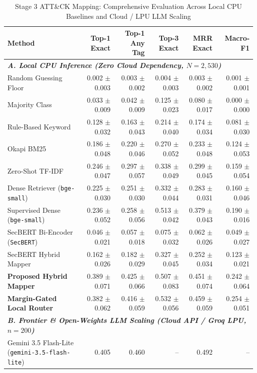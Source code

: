 \begin{table}[t]
\centering
\caption{Stage 3 ATT\&CK Mapping: Comprehensive Evaluation Across Local CPU Baselines and Cloud / LPU LLM Scaling}
\label{tab:baselines}
\begin{tabular}{lrrrrr}
\toprule
Method & Top-1 Exact & Top-1 Any Tag & Top-3 Exact & MRR Exact & Macro-F1 \\ \midrule
\multicolumn{6}{l}{\textit{\textbf{A. Local CPU Inference (Zero Cloud Dependency, $N=2{,}530$)}}} \\ \midrule
Random Guessing Floor & 0.002 $\pm$ 0.003 & 0.003 $\pm$ 0.002 & 0.004 $\pm$ 0.003 & 0.003 $\pm$ 0.002 & 0.001 $\pm$ 0.001 \\
Majority Class & 0.033 $\pm$ 0.009 & 0.042 $\pm$ 0.009 & 0.125 $\pm$ 0.023 & 0.080 $\pm$ 0.017 & 0.000 $\pm$ 0.000 \\
Rule-Based Keyword & 0.128 $\pm$ 0.032 & 0.163 $\pm$ 0.043 & 0.214 $\pm$ 0.040 & 0.174 $\pm$ 0.034 & 0.081 $\pm$ 0.030 \\
Okapi BM25 & 0.186 $\pm$ 0.048 & 0.220 $\pm$ 0.046 & 0.270 $\pm$ 0.052 & 0.233 $\pm$ 0.048 & 0.124 $\pm$ 0.053 \\
Zero-Shot TF-IDF & 0.246 $\pm$ 0.047 & 0.297 $\pm$ 0.057 & 0.338 $\pm$ 0.049 & 0.299 $\pm$ 0.045 & 0.159 $\pm$ 0.054 \\
Dense Retriever (\texttt{bge-small}) & 0.225 $\pm$ 0.030 & 0.251 $\pm$ 0.030 & 0.332 $\pm$ 0.044 & 0.283 $\pm$ 0.031 & 0.160 $\pm$ 0.046 \\
Supervised Dense (\texttt{bge-small}) & 0.236 $\pm$ 0.052 & 0.258 $\pm$ 0.056 & 0.513 $\pm$ 0.042 & 0.379 $\pm$ 0.043 & 0.190 $\pm$ 0.016 \\
SecBERT Bi-Encoder (\texttt{SecBERT}) & 0.046 $\pm$ 0.021 & 0.057 $\pm$ 0.018 & 0.075 $\pm$ 0.032 & 0.062 $\pm$ 0.026 & 0.049 $\pm$ 0.027 \\
SecBERT Hybrid Mapper & 0.162 $\pm$ 0.026 & 0.182 $\pm$ 0.029 & 0.327 $\pm$ 0.045 & 0.252 $\pm$ 0.034 & 0.123 $\pm$ 0.021 \\
\textbf{Proposed Hybrid Mapper} & 0.389 $\pm$ 0.071 & 0.425 $\pm$ 0.066 & 0.507 $\pm$ 0.083 & 0.451 $\pm$ 0.074 & 0.242 $\pm$ 0.064 \\
\textbf{Margin-Gated Local Router} & 0.382 $\pm$ 0.062 & 0.416 $\pm$ 0.059 & 0.532 $\pm$ 0.056 & 0.459 $\pm$ 0.059 & 0.254 $\pm$ 0.051 \\
\midrule
\multicolumn{6}{l}{\textit{\textbf{B. Frontier \& Open-Weights LLM Scaling (Cloud API / Groq LPU, $n=200$)}}} \\ \midrule
Gemini 3.5 Flash-Lite (\texttt{gemini-3.5-flash-lite}) & 0.405 & 0.460 & -- & 0.492 & -- \\

\end{tabular}
\end{table}
